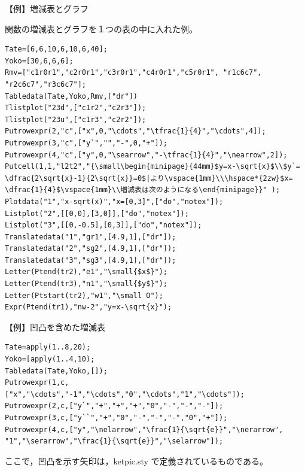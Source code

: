 \documentclass[papersize,a4paper,10pt,uplatex]{jsarticle}
\begin{document}
\begin{description}
\vspace{\baselineskip}
 \begin{center}\scalebox{0.9}{ } \end{center}


\vspace{\baselineskip}
【例】増減表とグラフ

関数の増減表とグラフを１つの表の中に入れた例。
\begin{verbatim}
Tate=[6,6,10,6,10,6,40];
Yoko=[30,6,6,6];
Rmv=["c1r0r1","c2r0r1","c3r0r1","c4r0r1","c5r0r1", "r1c6c7",
"r2c6c7","r3c6c7"]; 
Tabledata(Tate,Yoko,Rmv,["dr"])
Tlistplot("23d",["c1r2","c2r3"]);
Tlistplot("23u",["c1r3","c2r2"]);
Putrowexpr(2,"c",["x",0,"\cdots","\tfrac{1}{4}","\cdots",4]);
Putrowexpr(3,"c",["y`","","-",0,"+"]);
Putrowexpr(4,"c",["y",0,"\searrow","-\tfrac{1}{4}","\nearrow",2]);
Putcell(1,1,"l2t2","{\small\begin{minipage}{44mm}$y=x-\sqrt{x}$\\$y`=
\dfrac{2\sqrt{x}-1}{2\sqrt{x}}=0$|より\vspace{1mm}\\\hspace*{2zw}$x=
\dfrac{1}{4}$\vspace{1mm}\\増減表は次のようになる\end{minipage}}" );
Plotdata("1","x-sqrt(x)","x=[0,3]",["do","notex"]);
Listplot("2",[[0,0],[3,0]],["do","notex"]);
Listplot("3",[[0,-0.5],[0,3]],["do","notex"]);
Translatedata("1","gr1",[4.9,1],["dr"]);
Translatedata("2","sg2",[4.9,1],["dr"]);
Translatedata("3","sg3",[4.9,1],["dr"]);
Letter(Ptend(tr2),"e1","\small{$x$}");
Letter(Ptend(tr3),"n1","\small{$y$}");
Letter(Ptstart(tr2),"w1","\small O");
Expr(Ptend(tr1),"nw-2","y=x-\sqrt{x}");
\end{verbatim}
\begin{center}  \end{center}

\vspace{\baselineskip}
【例】凹凸を含めた増減表
\begin{verbatim}
Tate=apply(1..8,20);
Yoko=[apply(1..4,10);
Tabledata(Tate,Yoko,[]);
Putrowexpr(1,c,["x","\cdots","-1","\cdots","0","\cdots","1","\cdots"]);
Putrowexpr(2,c,["y`","+","+","+","0","-","-","-"]);
Putrowexpr(3,c,["y``","+","0","-","-","-","0","+"]);
Putrowexpr(4,c,["y","\nelarrow","\frac{1}{\sqrt{e}}","\nerarrow",
"1","\serarrow","\frac{1}{\sqrt{e}}","\selarrow"]);
\end{verbatim}
\begin{center}  \end{center}
ここで，凹凸を示す矢印は，ketpic.sty で定義されているものである。


\end{description}
\end{document}
